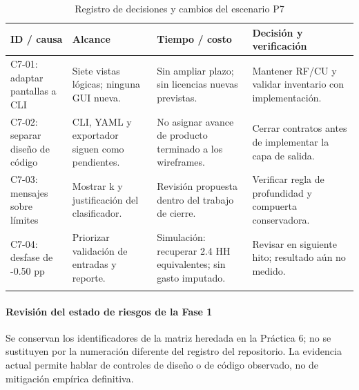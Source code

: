 \begin{table}[H]
\centering\small{}
\caption{Registro de decisiones y cambios del escenario P7}
\begin{tabularx}{\textwidth}{P{3.2cm}YYY}
\toprule
\textbf{ID / causa} & \textbf{Alcance} & \textbf{Tiempo / costo} & \textbf{Decisión y verificación} \\
\midrule
C7-01: adaptar pantallas a CLI & Siete vistas lógicas; ninguna GUI nueva. & Sin ampliar plazo; sin licencias nuevas previstas. & Mantener RF/CU y validar inventario con implementación. \\
\addlinespace
C7-02: separar diseño de código & CLI, YAML y exportador siguen como pendientes. & No asignar avance de producto terminado a los wireframes. & Cerrar contratos antes de implementar la capa de salida. \\
\addlinespace
C7-03: mensajes sobre límites & Mostrar k y justificación del clasificador. & Revisión propuesta dentro del trabajo de cierre. & Verificar regla de profundidad y compuerta conservadora. \\
\addlinespace
C7-04: desfase de -0.50 pp & Priorizar validación de entradas y reporte. & Simulación: recuperar 2.4 HH equivalentes; sin gasto imputado. & Revisar en siguiente hito; resultado aún no medido. \\
\addlinespace
\bottomrule
\end{tabularx}
\end{table}


\paragraph*{Revisión del estado de riesgos de la Fase 1}
Se conservan los identificadores de la matriz heredada en la Práctica 6; no se sustituyen por la numeración diferente del registro del repositorio. La evidencia actual permite hablar de controles de diseño o de código observado, no de mitigación empírica definitiva.


